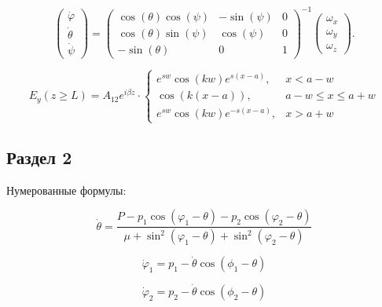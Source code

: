 \documentclass[14pt,oneside]{extarticle}
\begin{document}
\begin{equation}
    \begin{pmatrix} \dot{\varphi}\\ \dot{\theta} \\ \dot{\psi} \end{pmatrix}
    = \begin{pmatrix}
        \cos(\theta)\cos(\psi) & -\sin(\psi) & 0 \\
        \cos(\theta)\sin(\psi) & \cos(\psi)  & 0 \\
        -\sin(\theta)         & 0         &  1
    \end{pmatrix}^{-1}
    \begin{pmatrix} \omega_x\\ \omega_y \\ \omega_z \end{pmatrix}. \nonumber
\end{equation}


\begin{equation}
    E_{y}\left(z\geq L\right)=A_{12}e^{i\beta z}\cdot\begin{cases}
        e^{sw}\cos\left(kw\right)e^{s\left(x-a\right)}, & x<a-w\\
        \cos\left(k\left(x-a\right)\right), & a-w\leq x\le a+w\\
        e^{sw}\cos\left(kw\right)e^{-s\left(x-a\right)}, & x>a+w
        \end{cases}    
\end{equation}


\subsection{Раздел 2}

Нумерованные формулы:

\begin{equation}
\label{eq:1}
    \dot{\theta}=\frac{P-p_{1}\cos\left(\varphi_{1}-\theta\right)-p_{2}\cos\left(\varphi_{2}-\theta\right)}{\mu+\sin^{2}\left(\varphi_{1}-\theta\right)+\sin^{2}\left(\varphi_{2}-\theta\right)}
\end{equation}

\begin{equation}
    \dot{\varphi}_{1}=p_{1}-\dot{\theta}\cos(\phi_{1}-\theta)
\end{equation}

\begin{equation}
    \dot{\varphi}_{2}=p_{2}-\dot{\theta}\cos(\phi_{2}-\theta)
\end{equation}
\end{document}
